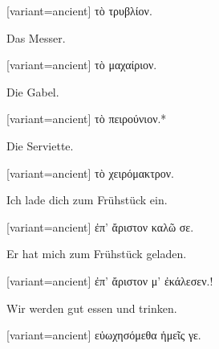 \begin{greek}[variant=ancient]%
τὸ τρυβλίον.

\end{greek}%
\switchcolumn*

Das Messer.

\switchcolumn

\begin{greek}[variant=ancient]%
τὸ μαχαίριον.

\end{greek}%
\switchcolumn*

Die Gabel.

\switchcolumn

\begin{greek}[variant=ancient]%
τὸ πειρούνιον.{*}

\end{greek}%
\switchcolumn*

Die Serviette.

\switchcolumn

\begin{greek}[variant=ancient]%
τὸ χειρόμακτρον.

\end{greek}%
\indent Ich lade dich zum Frühstück ein.

\switchcolumn

\begin{greek}[variant=ancient]%
ἐπ' ἄριστον καλῶ σε.

\end{greek}%
\switchcolumn*

Er hat mich zum Frühstück geladen.

\switchcolumn

\begin{greek}[variant=ancient]%
ἐπ' ἄριστον μ' ἐκάλεσεν.!

\end{greek}%
\switchcolumn*

Wir werden gut essen und trinken.

\switchcolumn

\begin{greek}[variant=ancient]%
εὐωχησόμεθα ἡμεῖς γε.

\end{greek}%
\switchcolumn*

